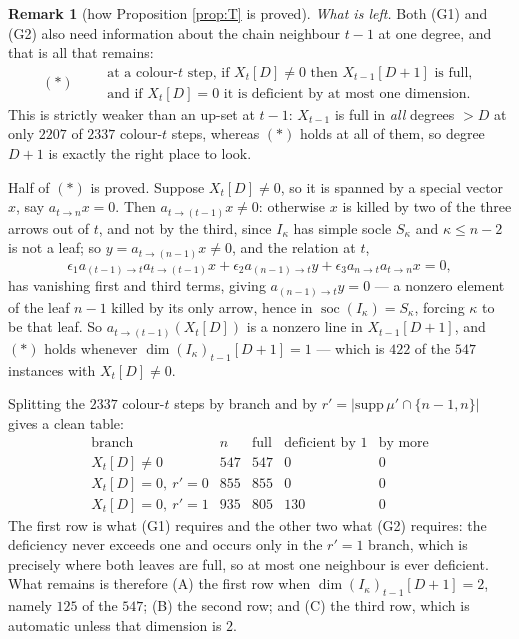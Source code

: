 \documentclass[11pt,reqno]{amsart}
\theoremstyle{plain}
\theoremstyle{definition}
\newtheorem{remark}[theorem]{Remark}
\DeclareMathOperator{\soc}{soc}
\newcommand{\ka}{\kappa}
\begin{document}
\begin{remark}[how Proposition \ref{prop:T} is proved]
\emph{What is left.}  Both (G1) and (G2) also need information about the chain
neighbour $t-1$ at one degree, and that is all that remains:
\[
   (*)\qquad
   \begin{array}{l}
   \text{at a colour-$t$ step, if } X_t[D]\ne0 \text{ then } X_{t-1}[D+1]
   \text{ is full,}\\
   \text{and if } X_t[D]=0 \text{ it is deficient by at most one dimension.}
   \end{array}
\]
This is strictly weaker than an up-set at $t-1$: $X_{t-1}$ is full in \emph{all}
degrees $>D$ at only $2207$ of $2337$ colour-$t$ steps, whereas $(*)$ holds at
all of them, so degree $D+1$ is exactly the right place to look.

Half of $(*)$ is proved.  Suppose $X_t[D]\ne0$, so it is spanned by a special
vector $x$, say $a_{t\to n}x=0$.  Then $a_{t\to(t-1)}x\ne0$: otherwise $x$ is
killed by two of the three arrows out of $t$, and not by the third, since
$I_\ka$ has simple socle $S_\ka$ and $\ka\le n-2$ is not a leaf; so
$y=a_{t\to(n-1)}x\ne0$, and the relation at $t$,
\[
   \epsilon_1 a_{(t-1)\to t}a_{t\to(t-1)}x+\epsilon_2 a_{(n-1)\to t}y
   +\epsilon_3 a_{n\to t}a_{t\to n}x=0,
\]
has vanishing first and third terms, giving $a_{(n-1)\to t}y=0$ --- a nonzero
element of the leaf $n-1$ killed by its only arrow, hence in
$\soc(I_\ka)=S_\ka$, forcing $\ka$ to be that leaf.  So
$a_{t\to(t-1)}(X_t[D])$ is a nonzero line in $X_{t-1}[D+1]$, and $(*)$ holds
whenever $\dim (I_\ka)_{t-1}[D+1]=1$ --- which is $422$ of the $547$ instances
with $X_t[D]\ne0$.

Splitting the $2337$ colour-$t$ steps by branch and by
$r'=|\mathrm{supp}\,\mu'\cap\{n-1,n\}|$ gives a clean table:
\[
\begin{array}{lcccc}
\text{branch} & n & \text{full} & \text{deficient by }1 & \text{by more}\\\hline
X_t[D]\ne0 & 547 & 547 & 0 & 0\\
X_t[D]=0,\ r'=0 & 855 & 855 & 0 & 0\\
X_t[D]=0,\ r'=1 & 935 & 805 & 130 & 0
\end{array}
\]
The first row is what (G1) requires and the other two what (G2) requires:
the deficiency never exceeds one and occurs only in the $r'=1$ branch, which is
precisely where both leaves are full, so at most one neighbour is ever
deficient.  What remains is therefore (A) the first row when
$\dim (I_\ka)_{t-1}[D+1]=2$, namely $125$ of the $547$; (B) the second row; and
(C) the third row, which is automatic unless that dimension is $2$.


\end{remark}
\end{document}
